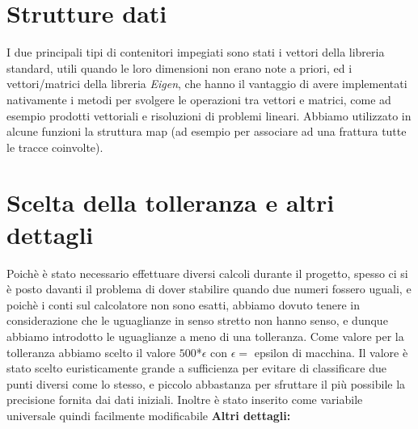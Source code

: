 \section{Strutture dati}
I due principali tipi di contenitori impegiati sono stati i vettori della libreria standard, utili quando le loro dimensioni non erano note a priori, ed i vettori/matrici della libreria \textit{Eigen}, che hanno il vantaggio di avere implementati nativamente i metodi per svolgere le operazioni tra vettori e matrici, come ad esempio prodotti vettoriali e risoluzioni di problemi lineari. \newline
Abbiamo utilizzato in alcune funzioni la struttura map (ad esempio per associare ad una frattura tutte le tracce coinvolte).

\section{Scelta della tolleranza e altri dettagli}
Poichè è stato necessario effettuare diversi calcoli durante il progetto, spesso ci si è posto davanti il problema di dover stabilire quando due numeri fossero uguali, e poichè i conti sul calcolatore non sono esatti, abbiamo dovuto tenere in considerazione che le uguaglianze in senso stretto non hanno senso, e dunque abbiamo introdotto le uguaglianze a meno di una tolleranza.
Come valore per la tolleranza abbiamo scelto il valore $500$*$\epsilon$ con $ \epsilon =$ epsilon di macchina. \newline
Il valore è stato scelto euristicamente grande a sufficienza per evitare di classificare due punti diversi come lo stesso, e piccolo abbastanza per sfruttare il più possibile la precisione fornita dai dati iniziali.  Inoltre è stato inserito come variabile universale quindi facilmente modificabile\newline
\newline
\textbf{Altri dettagli:} \newline
